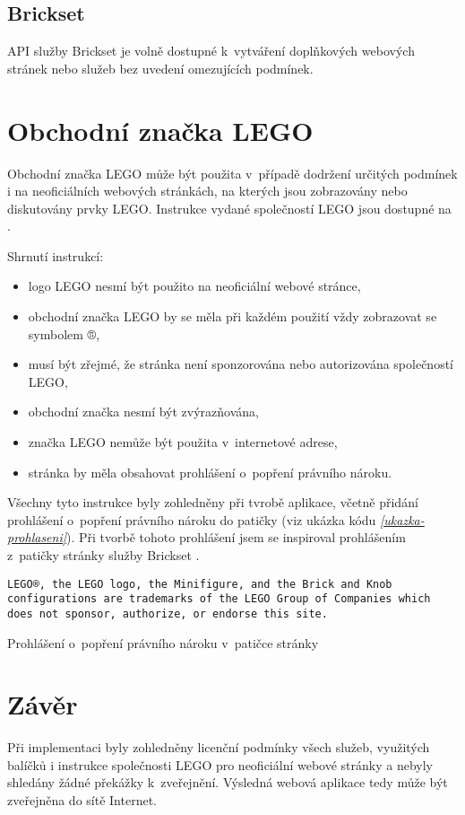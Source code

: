 \subsection{Brickset}
API služby Brickset je volně dostupné k~vytváření doplňkových webových stránek nebo služeb bez uvedení omezujících podmínek. \autocite{brickset:key} 

\section{Obchodní značka LEGO}
Obchodní značka LEGO může být použita v~případě dodržení určitých podmínek i na neoficiálních webových stránkách, na kterých jsou zobrazovány nebo diskutovány prvky LEGO. Instrukce vydané společností LEGO jsou dostupné na \autocite{lego:fair-play}.

Shrnutí instrukcí: 
\begin{itemize}
        \item logo LEGO nesmí být použito na neoficiální webové stránce,
        \item obchodní značka LEGO by se měla při každém použití vždy zobrazovat se symbolem ®,
        \item musí být zřejmé, že stránka není sponzorována nebo autorizována společností LEGO,
        \item obchodní značka nesmí být zvýrazňována,
        \item značka LEGO nemůže být použita v~internetové adrese,
        \item stránka by měla obsahovat prohlášení o~popření právního nároku.
\end{itemize}

Všechny tyto instrukce byly zohledněny při tvrobě aplikace, včetně přidání prohlášení o~popření právního nároku do patičky (viz ukázka kódu \emph{\ref{ukazka-prohlaseni}}). Při tvorbě tohoto prohlášení jsem se inspiroval prohlášením z~patičky stránky služby Brickset \autocite{brickset:about}.

\begin{listing}[htbp]
        \begin{verbatim}
LEGO®, the LEGO logo, the Minifigure, and the Brick and Knob 
configurations are trademarks of the LEGO Group of Companies which
does not sponsor, authorize, or endorse this site.
        \end{verbatim}
    \caption{Prohlášení o~popření právního nároku v~patičce stránky\label{ukazka-prohlaseni}}
\end{listing}

\section{Závěr}
Při implementaci byly zohledněny licenční podmínky všech služeb, využitých balíčků i instrukce společnosti LEGO pro neoficiální webové stránky a nebyly shledány žádné překážky k~zveřejnění. Výsledná webová aplikace tedy může být zveřejněna do sítě Internet.